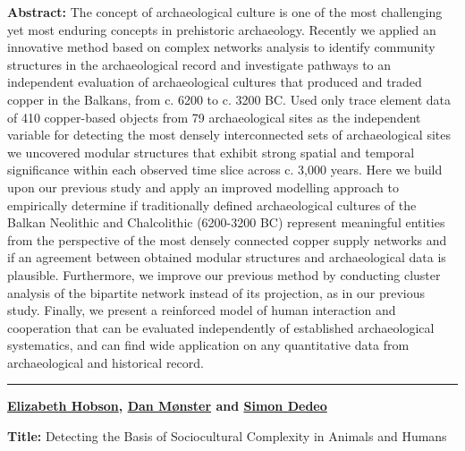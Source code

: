 \documentclass[]{article}
\begin{document}
\textbf{Abstract:} The concept of archaeological culture is one of the
most challenging yet most enduring concepts in prehistoric archaeology.
Recently we applied an innovative method based on complex networks
analysis to identify community structures in the archaeological record
and investigate pathways to an independent evaluation of archaeological
cultures that produced and traded copper in the Balkans, from c. 6200 to
c. 3200 BC. Used only trace element data of 410 copper-based objects
from 79 archaeological sites as the independent variable for detecting
the most densely interconnected sets of archaeological sites we
uncovered modular structures that exhibit strong spatial and temporal
significance within each observed time slice across c. 3,000 years. Here
we build upon our previous study and apply an improved modelling
approach to empirically determine if traditionally defined
archaeological cultures of the Balkan Neolithic and Chalcolithic
(6200-3200 BC) represent meaningful entities from the perspective of the
most densely connected copper supply networks and if an agreement
between obtained modular structures and archaeological data is
plausible. Furthermore, we improve our previous method by conducting
cluster analysis of the bipartite network instead of its projection, as
in our previous study. Finally, we present a reinforced model of human
interaction and cooperation that can be evaluated independently of
established archaeological systematics, and can find wide application on
any quantitative data from archaeological and historical record.

\rule{4cm}{.4pt}


{\bf {\href{http://hobsonresearch.com/}{Elizabeth Hobson},
\href{http://pure.au.dk/portal/en/danm@econ.au.dk}{Dan Mønster} and
\href{http://tuvalu.santafe.edu/~simon/}{Simon Dedeo}}}

\textbf{Title:} Detecting the Basis of Sociocultural Complexity in
Animals and Humans
\end{document}
